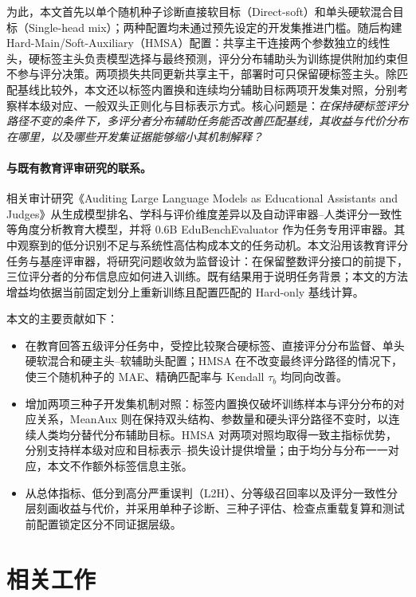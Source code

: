 \documentclass[UTF8,fontset=fandol,a4paper,11pt]{ctexart}
\begin{document}
为此，本文首先以单个随机种子诊断直接软目标（Direct-soft）和单头硬软混合目标（Single-head mix）；两种配置均未通过预先设定的开发集推进门槛。随后构建 Hard-Main/Soft-Auxiliary（HMSA）配置：共享主干连接两个参数独立的线性头，硬标签主头负责模型选择与最终预测，评分分布辅助头为训练提供附加约束但不参与评分决策。两项损失共同更新共享主干，部署时可只保留硬标签主头。除匹配基线比较外，本文还以标签内置换和连续均分辅助目标两项开发集对照，分别考察样本级对应、一般双头正则化与目标表示方式。核心问题是：\emph{在保持硬标签评分路径不变的条件下，多评分者分布辅助任务能否改善匹配基线，其收益与代价分布在哪里，以及哪些开发集证据能够缩小其机制解释？}

\paragraph{与既有教育评审研究的联系。}
相关审计研究《Auditing Large Language Models as Educational Assistants and Judges》从生成模型排名、学科与评价维度差异以及自动评审器--人类评分一致性等角度分析教育大模型，并将 0.6B EduBenchEvaluator 作为任务专用评审器\cite{prioraudit}。其中观察到的低分识别不足与系统性高估构成本文的任务动机。本文沿用该教育评分任务与基座评审器，将研究问题收敛为监督设计：在保留整数评分接口的前提下，三位评分者的分布信息应如何进入训练。既有结果用于说明任务背景；本文的方法增益均依据当前固定划分上重新训练且配置匹配的 Hard-only 基线计算。

本文的主要贡献如下：

\begin{itemize}[leftmargin=2em]
  \item 在教育回答五级评分任务中，受控比较聚合硬标签、直接评分分布监督、单头硬软混合和硬主头--软辅助头配置；HMSA 在不改变最终评分路径的情况下，使三个随机种子的 MAE、精确匹配率与 Kendall $\tau_b$ 均同向改善。
  \item 增加两项三种子开发集机制对照：标签内置换仅破坏训练样本与评分分布的对应关系，MeanAux 则在保持双头结构、参数量和硬头评分路径不变时，以连续人类均分替代分布辅助目标。HMSA 对两项对照均取得一致主指标优势，分别支持样本级对应和目标表示--损失设计提供增量；由于均分与分布一一对应，本文不作额外标签信息主张。
  \item 从总体指标、低分到高分严重误判（L2H）、分等级召回率以及评分一致性分层刻画收益与代价，并采用单种子诊断、三种子评估、检查点重载复算和测试前配置锁定区分不同证据层级。
\end{itemize}

\section{相关工作}
\end{document}
